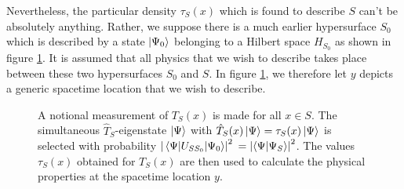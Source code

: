 Nevertheless, the particular density $\tau_S(x)$ which is found to describe $S$ can't be absolutely anything. Rather, we suppose there is a much earlier hypersurface $S_0$ which is described by a state $\ket{\Psi_0}$ belonging to a Hilbert space $H_{S_0}$ as shown in figure \ref{S1}.  It is assumed that all physics that we wish to describe takes place between these two hypersurfaces $S_0$ and $S$. In figure \ref{S1}, we therefore let $y$ depicts a generic spacetime location that we wish to describe. 

 \begin{figure}[ht!]
\captionsetup{justification=justified}
\centering



\vspace*{2px}
\caption{A notional measurement of $T_S(x)$ is made for all $x\in S$. The simultaneous  $\hat{T}_S$-eigenstate $\ket{\Psi}$ with $\hat{T}_S(x)\ket{\Psi}=\tau_S(x)\ket{\Psi}$ is selected with probability $\abs{\mel{\Psi}{U_{SS_0}}{\Psi_0}}^2$ $=\abs{\ip{\Psi}{\Psi_S}}^2$. The values $\tau_S(x)$ obtained for $T_S(x)$ are then used to calculate the physical properties at the spacetime location $y$.  }
\label{S1}
\end{figure} 
\vspace*{-12px}



